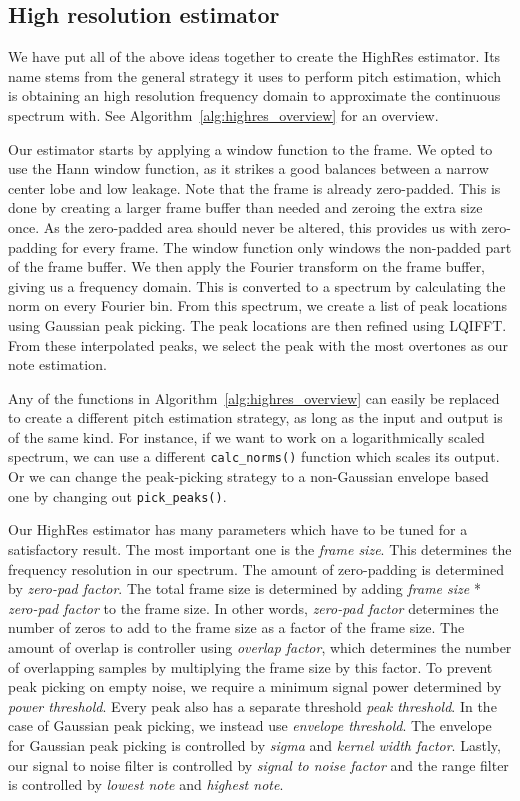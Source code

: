 \documentclass[a4paper,10pt,twocolumn]{article}
\begin{document}
\subsection{High resolution estimator}  \label{sec:highrespitch}
We have put all of the above ideas together to create the HighRes estimator. Its name stems from the general strategy it uses to perform pitch estimation, which is obtaining an high resolution frequency domain to approximate the continuous spectrum with. See Algorithm~\ref{alg:highres_overview} for an overview.

Our estimator starts by applying a window function to the frame. We opted to use the Hann window function, as it strikes a good balances between a narrow center lobe and low leakage. Note that the frame is already zero-padded. This is done by creating a larger frame buffer than needed and zeroing the extra size once. As the zero-padded area should never be altered, this provides us with zero-padding for every frame. The window function only windows the non-padded part of the frame buffer. We then apply the Fourier transform on the frame buffer, giving us a frequency domain. This is converted to a spectrum by calculating the norm on every Fourier bin. From this spectrum, we create a list of peak locations using Gaussian peak picking. The peak locations are then refined using LQIFFT. From these interpolated peaks, we select the peak with the most overtones as our note estimation. %

Any of the functions in Algorithm~\ref{alg:highres_overview} can easily be replaced to create a different pitch estimation strategy, as long as the input and output is of the same kind. For instance, if we want to work on a logarithmically scaled spectrum, we can use a different \texttt{calc\_norms()} function which scales its output. Or we can change the peak-picking strategy to a non-Gaussian envelope based one by changing out \texttt{pick\_peaks()}.

Our HighRes estimator has many parameters which have to be tuned for a satisfactory result. The most important one is the \textit{frame size}. This determines the frequency resolution in our spectrum. The amount of zero-padding is determined by \textit{zero-pad factor}. The total frame size is determined by adding \textit{frame size} * \textit{zero-pad factor} to the frame size. In other words, \textit{zero-pad factor} determines the number of zeros to add to the frame size as a factor of the frame size. The amount of overlap is controller using \textit{overlap factor}, which determines the number of overlapping samples by multiplying the frame size by this factor. To prevent peak picking on empty noise, we require a minimum signal power determined by \textit{power threshold}. Every peak also has a separate threshold \textit{peak threshold}. In the case of Gaussian peak picking, we instead use \textit{envelope threshold}. The envelope for Gaussian peak picking is controlled by \textit{sigma} and \textit{kernel width factor}. Lastly, our signal to noise filter is controlled by \textit{signal to noise factor} and the range filter is controlled by \textit{lowest note} and \textit{highest note}.
\end{document}
